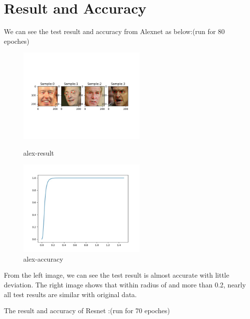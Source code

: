 \documentclass{article}
\begin{document}
\newpage
\section{Result and Accuracy}

We can see the test result and accuracy from Alexnet as below:(run for 80 epoches)

\begin{figure}[h]
	\begin{minipage}[t]{0.5\linewidth}
		\centering
		\includegraphics[width=2.5in]{alexresult.png}
		\caption{alex-result}
		\label{fig:side:a}
	\end{minipage}%
	\begin{minipage}[t]{0.5\linewidth}
		\centering
		\includegraphics[width=2.5in]{alexradius.jpg}
		\caption{alex-accuracy}
		\label{fig:side:b}
	\end{minipage}
\end{figure}
 
 From the left image, we can see the test result is almost accurate with little deviation. The right image shows that within radius of and more than 0.2, nearly all test results are similar with original data.
 
The result and accuracy of Resnet :(run for 70 epoches)
\end{document}
